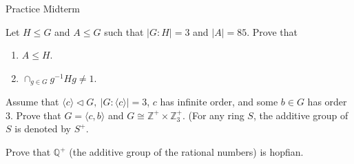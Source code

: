 \documentclass{article}
\begin{document}
\maketitle
Practice Midterm

\pagebreak

\begin{homeworkProblem}
    Let $H \leq G$ and $A \leq G$ such that 
    $\lvert G:H \rvert = 3$ and $\lvert A \rvert = 85$.
    Prove that 
    \begin{enumerate}
        \item $A \leq H$.
        \item $\cap_{g \in G} g^{-1} H g \neq 1$.
    \end{enumerate}
    

\end{homeworkProblem}

\pagebreak

\begin{homeworkProblem}
    Assume that $\langle c \rangle \lhd G, \ \lvert G : \langle c \rangle \rvert = 3$,
    $c$ has infinite order, and some $b \in G$
    has order $3$. 
    Prove that $G = \langle c, b \rangle$
    and $G \cong \mathbb{Z}^{+} \times \mathbb{Z}_3^{+}$.
    (For any ring $S$, the additive group of $S$
    is denoted by $S^{+}$.

    
\end{homeworkProblem}

\pagebreak

\begin{homeworkProblem}
    Prove that $\mathbb{Q}^{+}$ (the additive group of the rational numbers) is hopfian.

    
\end{homeworkProblem}
\end{document}
